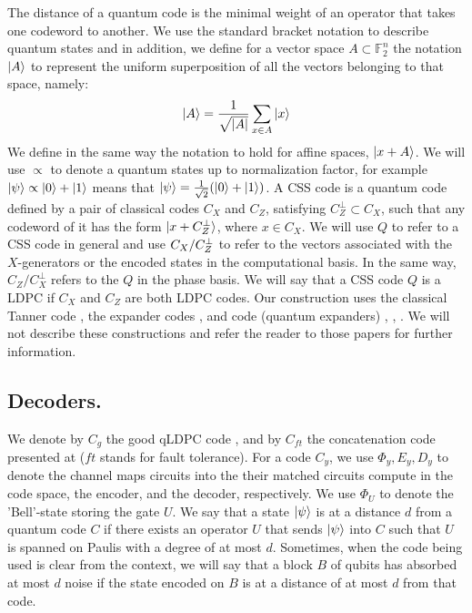 \documentclass[manuscript,screen,review]{acmart}
\begin{document}
{The distance of a quantum code is the minimal weight of an operator that takes one codeword to another. We use the standard bracket notation to describe quantum states and in addition, we define for a vector space $A \subset \mathbb{F}_{2}^{n}$ the notation $\ket{A}$ to represent the uniform superposition of all the vectors belonging to that space, namely: \begin{equation*}
  \begin{split}
\ket{A} = \frac{1}{\sqrt{|A|}}\sum_{x \in A}{\ket{x}}
  \end{split}
\end{equation*}
We define in the same way the notation to hold for affine spaces, $\ket{x +A}$. We will use $\propto$ to denote a quantum states up to normalization factor, for example $\ket{\psi} \propto \ket{0} + \ket{1}$ means that $\ket{\psi} = \frac{1}{\sqrt{2}}(\ket{0} + \ket{1})$.
A CSS code is a quantum code defined by a pair of classical codes $C_{X}$ and $C_{Z}$, satisfying $C_{Z}^{\perp} \subset C_{X}$, such that any codeword of it has the form $\ket{x + C_{Z}^\perp}$, where $x \in C_{X}$. We will use $Q$ to refer to a CSS code in general and use $C_{X}/C_{Z}^\perp$ to refer to the vectors associated with the $X$-generators or the encoded states in the computational basis. In the same way, $C_{Z}/C_{X}^{\perp}$ refers to the $Q$ in the phase basis. We will say that a CSS code $Q$ is a LDPC if $C_{X}$ and $C_{Z}$ are both LDPC codes. Our construction uses the classical Tanner code \cite{Tanner}, the expander codes \cite{ExpanderCodes}, and \Hyp  code (quantum expanders) \cite{Leverrier_2015}, \cite{Tillich_2014}, \cite{overheadofquantumerrorcorrection}. We will not describe these constructions and refer the reader to those papers for further information.

\subsection{Decoders.} \label{sec:decoders} We denote by $C_{g}$ the good qLDPC code \cite{Dinur} \cite{Pavel} \cite{leverrier2022quantum}, and by $C_{ft}$ the concatenation code presented at \cite{aharonov1999faulttolerant} ($ft$ stands for fault tolerance). For a code $C_{y}$, we use $\Phi_{y}, E_{y}, D_{y}$ to denote the channel maps circuits into the their matched circuits compute in the code space, the encoder, and the decoder, respectively. We use $\Phi_{U}$ to denote the 'Bell'-state storing the gate $U$. We say that a state $\ket{\psi}$ is at a distance $d$ from a quantum code $C$ if there exists an operator $U$ that sends $\ket{\psi}$ into $C$ such that $U$ is spanned on Paulis with a degree of at most $d$. Sometimes, when the code being used is clear from the context, we will say that a block $B$ of qubits has absorbed at most $d$ noise if the state encoded on $B$ is at a distance of at most $d$ from that code.


}
\end{document}
